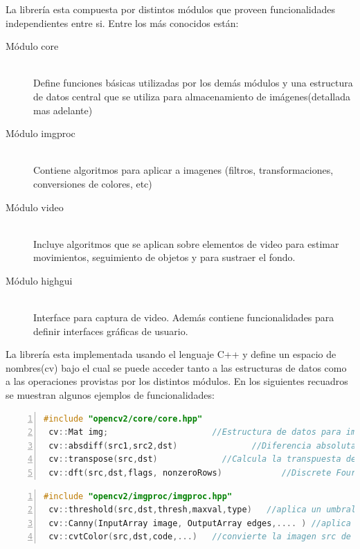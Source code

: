 \documentclass[a4paper,10pt]{report}
\begin{document}
La librería esta compuesta por distintos módulos que proveen funcionalidades independientes entre si. Entre los más conocidos están:

\begin{description}
 \item[Módulo core] \hfill \\Define funciones básicas utilizadas por los demás módulos y una estructura de datos central que se utiliza para almacenamiento de imágenes(detallada mas adelante)  
 \item[Módulo imgproc] \hfill \\Contiene algoritmos para aplicar a imagenes (filtros, transformaciones, conversiones de colores, etc)
 \item[Módulo video]\hfill \\ Incluye algoritmos que se aplican sobre elementos de video para estimar movimientos, seguimiento de objetos y para sustraer el fondo.
 \item[Módulo highgui]\hfill \\ Interface para captura de video. Además contiene funcionalidades para definir interfaces gráficas de usuario.
\end{description}


  
La librería esta implementada usando el lenguaje C++ y define un espacio de nombres(cv) bajo el cual se puede acceder tanto a las estructuras de datos como a las operaciones provistas por los distintos módulos.
En los siguientes recuadros se muestran algunos ejemplos de funcionalidades:


\begin{lstlisting}[caption={Módulo core},frame=bt,columns=fullflexible,numbers=left,backgroundcolor=\color{LemonChiffon1},basicstyle=\small,keywordstyle=\ttfamily\small,language=C++,stringstyle=\ttfamily,breaklines=true,xleftmargin=0.5em,xrightmargin=0pt,aboveskip=\bigskipamount,belowskip=\bigskipamount]
 #include "opencv2/core/core.hpp"
 cv::Mat img;				      //Estructura de datos para imagenes
 cv::absdiff(src1,src2,dst)  	          //Diferencia absoluta entre src1 y src2
 cv::transpose(src,dst)   	        //Calcula la transpuesta de la matriz src
 cv::dft(src,dst,flags, nonzeroRows)            //Discrete Fourier transformation
\end{lstlisting}



\begin{lstlisting}[caption={Módulo imgproc},frame=bt,columns=fullflexible,numbers=left,backgroundcolor=\color{LemonChiffon1},basicstyle=\small,keywordstyle=\ttfamily\small,language=C++,stringstyle=\ttfamily,breaklines=true,xleftmargin=0.5em,xrightmargin=0pt,aboveskip=\bigskipamount,belowskip=\bigskipamount]
 #include "opencv2/imgproc/imgproc.hpp" 
 cv::threshold(src,dst,thresh,maxval,type)   //aplica un umbral a los valores del input
 cv::Canny(InputArray image, OutputArray edges,.... ) //aplica el algoritmo de Canny para buscar bordes en la imagen
 cv::cvtColor(src,dst,code,...)   //convierte la imagen src de un espacio de colores a otro 
\end{lstlisting}
\end{document}
